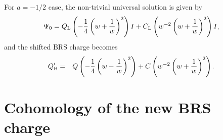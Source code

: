 \documentclass[a4paper,seceq,preprint]{ptptex}
\newcommand{\rL}{{\rm L}}
\newcommand{\Q}{Q_{\rm B}}
\begin{document}
For $a=-1/2$ case, the non-trivial universal solution is given
by\cite{rf:TT2} 
\begin{eqnarray}
\label{Eq:solution2}
 \Psi_0 = Q_\rL\left(-\frac{1}{4}\left(w+\frac{1}{w}\right)^2\right) I
 +C_\rL\left(w^{-2}\left(w+\frac{1}{w}\right)^2\right) I,
\end{eqnarray}
and the shifted BRS charge becomes
\begin{eqnarray}
\label{Eq:shiftedBRS}
 \Q'&=& Q\left(-\frac{1}{4}\left(w-\frac{1}{w}\right)^2\right)
   +C\left(w^{-2}\left(w+\frac{1}{w}\right)^2\right).
\end{eqnarray}

\section{Cohomology of the new BRS charge}
\end{document}
